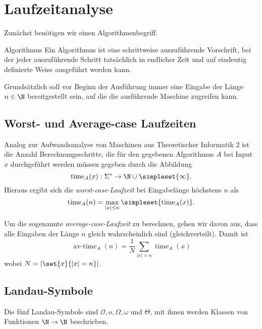 
\renewcommand{\time}{\operatorname{time}}
\newcommand{\avtime}{\operatorname{av-time}}
\renewcommand{\O}{\mathcal O}

\chapter{Laufzeitanalyse}
Zunächst benötigen wir einen Algorithmenbegriff.
\begin{definition}{Algorithmus}
	Ein Algorithmus ist eine schrittweise auszuführende Vorschrift, bei der jeder auszuführende Schritt tatsächlich in endlicher Zeit und auf eindeutig definierte Weise ausgeführt werden kann.
\end{definition}
Grundsätzlich soll vor Beginn der Ausführung immer eine Eingabe der Länge $n\in\N$ bereitgestellt sein, auf die die ausführende Maschine zugreifen kann.

\section{Worst- und Average-case Laufzeiten}
Analog zur Aufwandsanalyse von Maschinen aus Theoretischer Informatik 2 ist die Anzahl Berechnungsschritte, die für den gegebenen Algorithmus $A$ bei Input $x$ durchgeführt werden müssen gegeben durch die Abbildung
\begin{equation*}
 	\time_A(x):\Sigma^\ast \rightarrow \N\cup\simpleset{\infty}.
\end{equation*}
Hieraus ergibt sich die \emph{worst-case-Laufzeit} bei Eingabelänge höchstens $n$ als
\begin{equation*}
	\time_A(n)=\max_{|x|\leq n}\simpleset{\time_A(x)}.
\end{equation*}


Um die sogenannte \emph{average-case-Laufzeit} zu berechnen, gehen wir davon aus, dass alle Eingaben der Länge $n$ gleich wahrscheinlich sind (gleichverteilt).
Damit ist
\begin{equation*}
	\avtime_A(n)=\frac{1}{N}\sum_{|x|=n}\time_A(x)
\end{equation*}
wobei $N=|\set{x}{|x|=n}|$.


\section{Landau-Symbole}
Die fünf Landau-Symbole sind $\O, o, \Omega,\omega$ und $\Theta$, mit ihnen werden Klassen von Funktionen $\N\rightarrow\N$ beschrieben.

